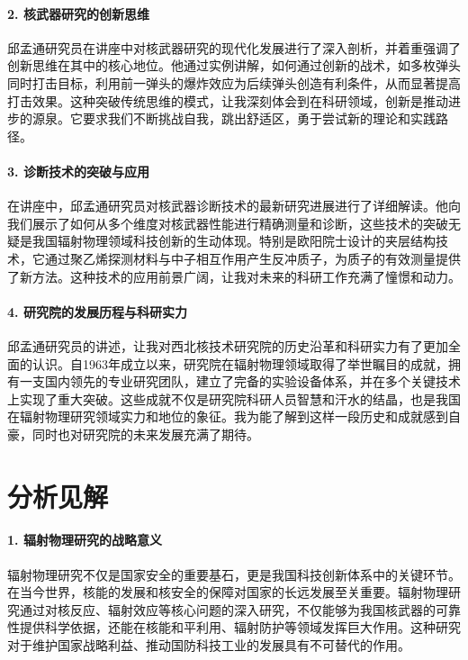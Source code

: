 \documentclass[UTF8]{ctexart}
\begin{document}
\paragraph{2. 核武器研究的创新思维}
邱孟通研究员在讲座中对核武器研究的现代化发展进行了深入剖析，并着重强调了创新思维在其中的核心地位。他通过实例讲解，如何通过创新的战术，如多枚弹头同时打击目标，利用前一弹头的爆炸效应为后续弹头创造有利条件，从而显著提高打击效果。这种突破传统思维的模式，让我深刻体会到在科研领域，创新是推动进步的源泉。它要求我们不断挑战自我，跳出舒适区，勇于尝试新的理论和实践路径。

\paragraph{3. 诊断技术的突破与应用}
在讲座中，邱孟通研究员对核武器诊断技术的最新研究进展进行了详细解读。他向我们展示了如何从多个维度对核武器性能进行精确测量和诊断，这些技术的突破无疑是我国辐射物理领域科技创新的生动体现。特别是欧阳院士设计的夹层结构技术，它通过聚乙烯探测材料与中子相互作用产生反冲质子，为质子的有效测量提供了新方法。这种技术的应用前景广阔，让我对未来的科研工作充满了憧憬和动力。

\paragraph{4. 研究院的发展历程与科研实力}
邱孟通研究员的讲述，让我对西北核技术研究院的历史沿革和科研实力有了更加全面的认识。自1963年成立以来，研究院在辐射物理领域取得了举世瞩目的成就，拥有一支国内领先的专业研究团队，建立了完备的实验设备体系，并在多个关键技术上实现了重大突破。这些成就不仅是研究院科研人员智慧和汗水的结晶，也是我国在辐射物理研究领域实力和地位的象征。我为能了解到这样一段历史和成就感到自豪，同时也对研究院的未来发展充满了期待。

\section{分析见解}

\paragraph{1. 辐射物理研究的战略意义}
辐射物理研究不仅是国家安全的重要基石，更是我国科技创新体系中的关键环节。在当今世界，核能的发展和核安全的保障对国家的长远发展至关重要。辐射物理研究通过对核反应、辐射效应等核心问题的深入研究，不仅能够为我国核武器的可靠性提供科学依据，还能在核能和平利用、辐射防护等领域发挥巨大作用。这种研究对于维护国家战略利益、推动国防科技工业的发展具有不可替代的作用。
\end{document}
